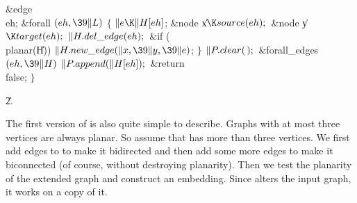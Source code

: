\&{edge} \\{eh};\7
\&{forall} ${}(\\{eh},\39\|L){}$\5
${}\{{}$\1\6
${}\|e\K\|H[\\{eh}]{}$;\7
\&{node} \|x${}\K\\{source}(\\{eh});{}$\6
\&{node} \|y${}\K\\{target}(\\{eh});{}$\7
${}\|H.\\{del\_edge}(\\{eh});{}$\6
\&{if} (\\{planar}(\|H))\1\5
${}\|H.\\{new\_edge}(\|x,\39\|y,\39\|e){}$;\2\6
\4${}\}{}$\2\6
${}\|P.\\{clear}(\,);{}$\6
\&{forall\_edges} ${}(\\{eh},\39\|H){}$\1\5
${}\|P.\\{append}(\|H[\\{eh}]);{}$\2\6
\&{return} \\{false};\6
\4${}\}{}$\2\par
\U2.\fi

The first version of  is also quite simple to describe.
Graphs with at most three
vertices are always planar. So assume that  has more than three
vertices. We first add edges to  to make it bidirected
and then add some more edges to make
it biconnected (of course, without destroying planarity). Then we test
the planarity of the extended graph and construct an embedding.
Since  alters the input graph, it works on a copy of it.



